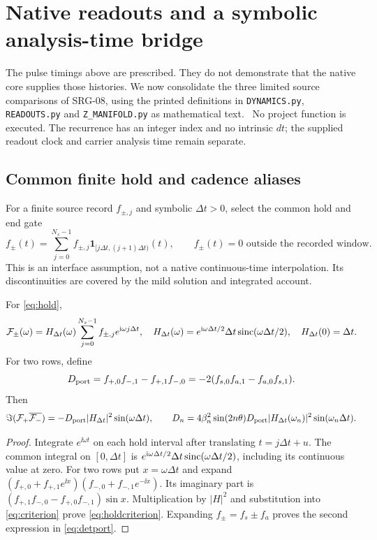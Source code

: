 \section{Native readouts and a symbolic analysis-time bridge}\label{sec:native}
The pulse timings above are prescribed. They do not demonstrate that the native core supplies those histories. We now consolidate the three limited source comparisons of SRG-08, using the printed definitions in \texttt{DYNAMICS.py}, \texttt{READOUTS.py} and \texttt{Z\_MANIFOLD.py} as mathematical text.~\cite{Native,SRG08} No project function is executed. The recurrence has an integer index and no intrinsic $dt$; the supplied readout clock and carrier analysis time remain separate.

\subsection{Common finite hold and cadence aliases}
For a finite source record $f_{\pm,j}$ and symbolic $\Delta t>0$, select the common hold and end gate
\begin{equation}\label{eq:hold}
 f_\pm(t)=\sum_{j=0}^{N_s-1}f_{\pm,j}\mathbf1_{[j\Delta t,(j+1)\Delta t)}(t),
 \qquad f_\pm(t)=0\text{ outside the recorded window}.
\end{equation}
This is an interface assumption, not a native continuous-time interpolation. Its discontinuities are covered by the mild solution and integrated account.

\begin{proposition}\label{prop:hold}
For \eqref{eq:hold},
\begin{equation}\label{eq:holdfactor}
 \mathcal F_\pm(\omega)=H_{\Delta t}(\omega)\sum_{j=0}^{N_s-1}f_{\pm,j}e^{\mathrm i\omega j\Delta t},
 \quad H_{\Delta t}(\omega)=e^{\mathrm i\omega\Delta t/2}\Delta t\operatorname{sinc}(\omega\Delta t/2),
 \quad H_{\Delta t}(0)=\Delta t.
\end{equation}
For two rows, define
\begin{equation}\label{eq:detport}
 D_{\rm port}=f_{+,0}f_{-,1}-f_{+,1}f_{-,0}
 =-2(f_{s,0}f_{a,1}-f_{a,0}f_{s,1}).
\end{equation}
Then
\begin{equation}\label{eq:holdcriterion}
 \Im(\mathcal F_+\overline{\mathcal F_-})=-D_{\rm port}|H_{\Delta t}|^2\sin(\omega\Delta t),
 \qquad D_n=4\beta_n^2\sin(2n\theta)D_{\rm port}
 |H_{\Delta t}(\omega_n)|^2\sin(\omega_n\Delta t).
\end{equation}
\end{proposition}
\begin{proof}
Integrate $e^{\ii\omega t}$ on each hold interval after translating $t=j\Delta t+u$. The common integral on $[0,\Delta t]$ is $e^{\mathrm i\omega\Delta t/2}\Delta t\operatorname{sinc}(\omega\Delta t/2)$, including its continuous value at zero. For two rows put $x=\omega\Delta t$ and expand
$(f_{+,0}+f_{+,1}e^{\ii x})(f_{-,0}+f_{-,1}e^{-\ii x})$.
Its imaginary part is $(f_{+,1}f_{-,0}-f_{+,0}f_{-,1})\sin x$. Multiplication by $|H|^2$ and substitution into \eqref{eq:criterion} prove \eqref{eq:holdcriterion}. Expanding $f_\pm=f_s\pm f_a$ proves the second expression in \eqref{eq:detport}.
\end{proof}

